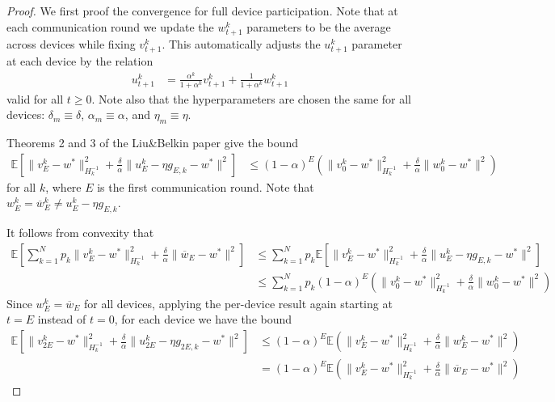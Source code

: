 \begin{proof}
We first proof the convergence for full device participation. Note
that at each communication round we update the $w_{t+1}^{k}$ parameters
to be the average across devices while fixing $v_{t+1}^{k}$. This
automatically adjusts the $u_{t+1}^{k}$ parameter at each device
by the relation 
\begin{align*}
u_{t+1}^{k} & =\frac{\alpha^{k}}{1+\alpha^{k}}v_{t+1}^{k}+\frac{1}{1+\alpha^{k}}w_{t+1}^{k}
\end{align*}
 valid for all $t\geq0$. Note also that the hyperparameters are chosen
the same for all devices: $\delta_{m}\equiv\delta$, $\alpha_{m}\equiv\alpha$,
and $\eta_{m}\equiv\eta$. 

Theorems 2 and 3 of the Liu\&Belkin paper give the bound 
\begin{align*}
\mathbb{E}\left[\|v_{E}^{k}-w^{\ast}\|_{H_{k}^{-1}}^{2}+\frac{\delta}{\alpha}\|u_{E}^{k}-\eta g_{E,k}-w^{\ast}\|^{2}\right] & \leq(1-\alpha)^{E}(\|v_{0}^{k}-w^{\ast}\|_{H_{k}^{-1}}^{2}+\frac{\delta}{\alpha}\|w_{0}^{k}-w^{\ast}\|^{2})
\end{align*}
for all $k$, where $E$ is the first communication round. Note that
$w_{E}^{k}=\overline{w}_{E}^{k}\neq u_{E}^{k}-\eta g_{E,k}$.

It follows from convexity that 
\begin{align*}
\mathbb{E}\left[\sum_{k=1}^{N}p_{k}\|v_{E}^{k}-w^{\ast}\|_{H_{k}^{-1}}^{2}+\frac{\delta}{\alpha}\|\overline{w}_{E}-w^{\ast}\|^{2}\right] & \leq\sum_{k=1}^{N}p_{k}\mathbb{E}\left[\|v_{E}^{k}-w^{\ast}\|_{H_{k}^{-1}}^{2}+\frac{\delta}{\alpha}\|u_{E}^{k}-\eta g_{E,k}-w^{\ast}\|^{2}\right]\\
 & \leq\sum_{k=1}^{N}p_{k}(1-\alpha)^{E}(\|v_{0}^{k}-w^{\ast}\|_{H_{k}^{-1}}^{2}+\frac{\delta}{\alpha}\|w_{0}^{k}-w^{\ast}\|^{2})
\end{align*}
Since $w_{E}^{k}=\overline{w}_{E}$ for all devices, applying the
per-device result again starting at $t=E$ instead of $t=0$, for
each device we have the bound
\begin{align*}
\mathbb{E}\left[\|v_{2E}^{k}-w^{\ast}\|_{H_{k}^{-1}}^{2}+\frac{\delta}{\alpha}\|u_{2E}^{k}-\eta g_{2E,k}-w^{\ast}\|^{2}\right] & \leq(1-\alpha)^{E}\mathbb{E}(\|v_{E}^{k}-w^{\ast}\|_{H_{k}^{-1}}^{2}+\frac{\delta}{\alpha}\|w_{E}^{k}-w^{\ast}\|^{2})\\
 & =(1-\alpha)^{E}\mathbb{E}(\|v_{E}^{k}-w^{\ast}\|_{H_{k}^{-1}}^{2}+\frac{\delta}{\alpha}\|\overline{w}_{E}-w^{\ast}\|^{2})
\end{align*}


\end{proof}
